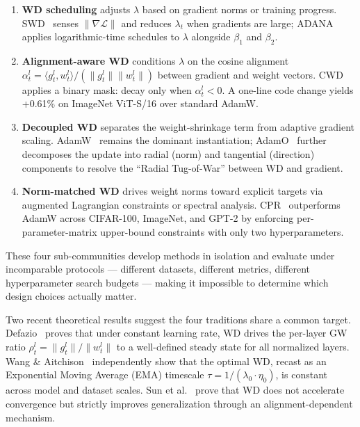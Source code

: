 \documentclass{article}
\begin{document}
\begin{enumerate}
\item \textbf{WD scheduling} adjusts $\lambda$ based on gradient norms or training progress. SWD~\citep{xie2023weight} senses $\|\nabla \mathcal{L}\|$ and reduces $\lambda_t$ when gradients are large; ADANA~\citep{ferbach2026adana} applies logarithmic-time schedules to $\lambda$ alongside $\beta_1$ and $\beta_2$.

\item \textbf{Alignment-aware WD} conditions $\lambda$ on the cosine alignment $\alpha_t^l = \langle g_t^l, w_t^l \rangle / (\|g_t^l\| \|w_t^l\|)$ between gradient and weight vectors. CWD~\citep{chen2026cwd} applies a binary mask: decay only when $\alpha_t^l < 0$. A one-line code change yields +0.61\% on ImageNet ViT-S/16 over standard AdamW.

\item \textbf{Decoupled WD} separates the weight-shrinkage term from adaptive gradient scaling. AdamW~\citep{loshchilov2019decoupled} remains the dominant instantiation; AdamO~\citep{chen2026adamo} further decomposes the update into radial (norm) and tangential (direction) components to resolve the ``Radial Tug-of-War'' between WD and gradient.

\item \textbf{Norm-matched WD} drives weight norms toward explicit targets via augmented Lagrangian constraints or spectral analysis. CPR~\citep{franke2024cpr} outperforms AdamW across CIFAR-100, ImageNet, and GPT-2 by enforcing per-parameter-matrix upper-bound constraints with only two hyperparameters.
\end{enumerate}

These four sub-communities develop methods in isolation and evaluate under incomparable protocols --- different datasets, different metrics, different hyperparameter search budgets --- making it impossible to determine which design choices actually matter.

Two recent theoretical results suggest the four traditions share a common target. Defazio~\citep{defazio2025gw} proves that under constant learning rate, WD drives the per-layer GW ratio $\rho_t^l = \|g_t^l\| / \|w_t^l\|$ to a well-defined steady state for all normalized layers. Wang \& Aitchison~\citep{wang2025ema} independently show that the optimal WD, recast as an Exponential Moving Average (EMA) timescale $\tau = 1/(\lambda_0 \cdot \eta_0)$, is constant across model and dataset scales. Sun et al.~\citep{sun2025convergence} prove that WD does not accelerate convergence but strictly improves generalization through an alignment-dependent mechanism.
\end{document}
